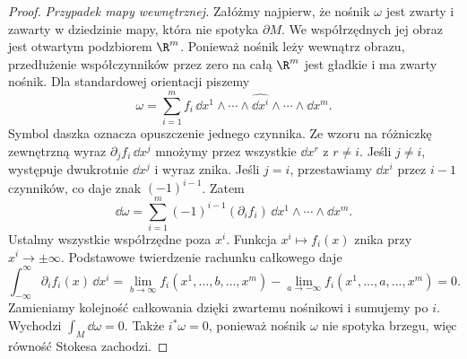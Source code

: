 \begin{proof}
\emph{Przypadek mapy wewnętrznej.}
Załóżmy najpierw, że nośnik $\omega$ jest zwarty
i zawarty w dziedzinie mapy, która nie spotyka
$\partial M$. We współrzędnych jej obraz jest
otwartym podzbiorem $\R^m$. Ponieważ nośnik
leży wewnątrz obrazu, przedłużenie współczynników
przez zero na całą $\R^m$ jest gładkie i ma
zwarty nośnik. Dla standardowej orientacji piszemy
\[
 \omega=\sum_{i=1}^m f_i\,
 \dd x^1\wedge\cdots\wedge\widehat{\dd x^i}
      \wedge\cdots\wedge\dd x^m.
\]
Symbol daszka oznacza opuszczenie jednego czynnika.
Ze wzoru na różniczkę zewnętrzną wyraz
$\partial_j f_i\,\dd x^j$ mnożymy przez wszystkie
$\dd x^r$ z $r\ne i$. Jeśli $j\ne i$, występuje
dwukrotnie $\dd x^j$ i wyraz znika. Jeśli $j=i$,
przestawiamy $\dd x^i$ przez $i-1$ czynników,
co daje znak $(-1)^{i-1}$. Zatem
\[
 \dd\omega=\sum_{i=1}^m(-1)^{i-1}
 (\partial_i f_i)\,\dd x^1\wedge\cdots\wedge\dd x^m.
\]
Ustalmy wszystkie współrzędne poza $x^i$.
Funkcja $x^i\mapsto f_i(x)$ znika przy
$x^i\to\pm\infty$. Podstawowe twierdzenie
rachunku całkowego daje
\[
 \int_{-\infty}^{\infty}\partial_i f_i(x)\,\dd x^i
 =\lim_{b\to\infty}f_i(x^1,\ldots,b,\ldots,x^m)
  -\lim_{a\to-\infty}f_i(x^1,\ldots,a,\ldots,x^m)=0.
\]
Zamieniamy kolejność całkowania dzięki zwartemu
nośnikowi i sumujemy po $i$. Wychodzi
$\int_M\dd\omega=0$. Także
$i^*\omega=0$, ponieważ nośnik $\omega$ nie
spotyka brzegu, więc równość Stokesa zachodzi.


\end{proof}
